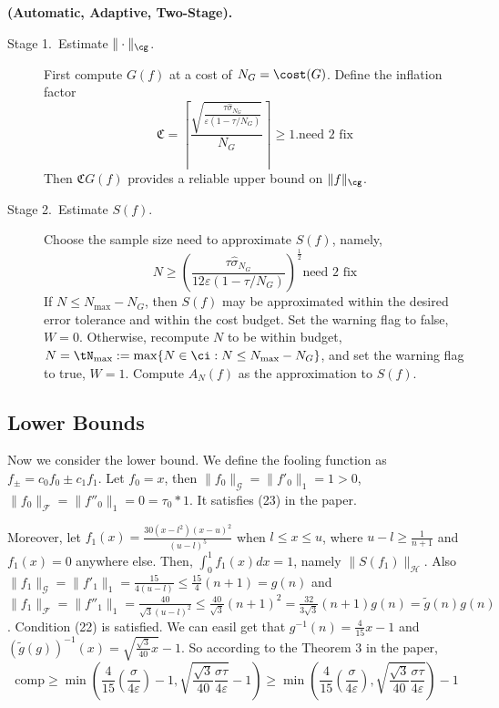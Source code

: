 \begin{algo} \label{twostagedetalgo} {\bf (Automatic, Adaptive, Two-Stage).}

\begin{description}

\item[Stage 1.\ Estimate {$\|\cdot\|_{\cg}$}.] First compute $G(f)$ at a cost of $N_{G} = \cost(G)$.   Define the inflation factor
\begin{equation}\label{norminflate}
\mathfrak{C} =\left\lceil\frac{\sqrt{\frac{\tau \hat{\sigma}_{N_G}}{\varepsilon(1 - \tau/ N_G)}}}{N_{G}}\right\rceil \ge 1. \text{need 2 fix}
\end{equation}
Then $\mathfrak{C} G(f)$ provides a reliable upper bound on $\|f\|_{\cg}$.

\item [Stage 2.\ Estimate {$S(f)$}.] Choose the sample size need to approximate $S(f)$, namely,
\[
N \geq \left(\frac{\tau \hat{\sigma}_{N_G}}{12\varepsilon(1-\tau/N_G)}\right)^{\frac{1}{2}} \text{need 2 fix}
\]
If $N \le N_{\max}-N_G$, then $S(f)$ may be approximated within the desired error tolerance and within the cost budget.  Set the warning flag to false, $W=0$. Otherwise, recompute $N$ to be within budget, $N = \tN_{\max} := \max\{N \in \ci : N\le N_{\max} -  N_G\}$, and set the warning flag to true, $W=1$.  Compute $A_N(f)$ as the approximation to $S(f)$.
\end{description}
\end{algo}


\subsection{Lower Bounds}
Now we consider the lower bound. We define the fooling function as $f_{\pm}=c_0f_0\pm c_1f_1$. Let $f_0=x$, then $\|f_0\|_{\mathcal{G}}=\|f'_0\|_1=1>0$, $\|f_0\|_{\mathcal{F}}=\|f''_0\|_1=0=\tau_0*1$. It satisfies (23) in the paper.

Moreover, let $f_1(x)=\frac{30(x-l^2)(x-u)^2}{(u-l)^5}$ when $l \leq x \leq u$, where $u-l\geq\frac{1}{n+1}$ and $f_1(x)=0$ anywhere else. Then, $\int_{0}^{1}f_1(x)dx=1$, namely $\|S(f_1)\|_{\mathcal{H}}$. Also $\|f_1\|_{\mathcal{G}}=\|f'_{1}\|_1=\frac{15}{4(u-l)}\leq \frac{15}{4}(n+1)=g(n)$ and $\|f_1\|_{\mathcal{F}}=\|f''_{1}\|_1=\frac{40}{\sqrt{3}(u-l)^2}\leq \frac{40}{\sqrt{3}}(n+1)^2=\frac{32}{3\sqrt{3}}(n+1)g(n)=\tilde{g}(n)g(n)$. Condition (22) is satisfied. We can easil get that $g^{-1}(n)=\frac{4}{15}x-1$ and $(\tilde{g}(g))^{-1}(x)=\sqrt{\frac{\sqrt{3}}{40}x}-1$. So according to the Theorem 3 in the paper, $$\text{comp}\geq \min\left(\frac{4}{15}(\frac{\sigma}{4\varepsilon})-1,\sqrt{\frac{\sqrt{3}}{40}\frac{\sigma\tau}{4\varepsilon}}-1\right)\geq\min\left(\frac{4}{15}(\frac{\sigma}{4\varepsilon}),\sqrt{\frac{\sqrt{3}}{40}\frac{\sigma\tau}{4\varepsilon}}\right)-1$$

